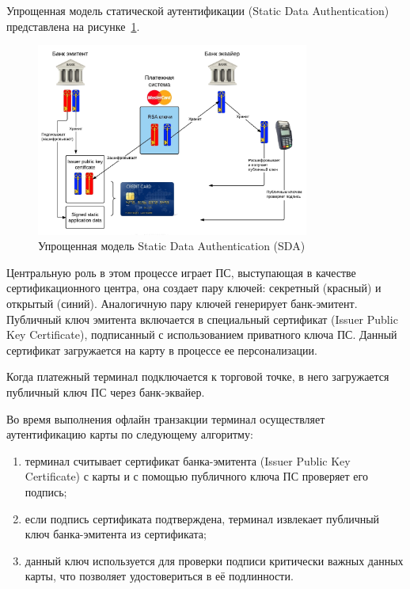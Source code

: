 Упрощенная модель статической аутентификации (Static Data Authentication) представлена на рисунке~\ref{fig:sda}.

\begin{figure}[H]
    \centering
    \includegraphics[width=0.8\textwidth]{images/research/sda}
    \caption{\centering Упрощенная модель Static Data Authentication (SDA)}
    \label{fig:sda}
\end{figure}

Центральную роль в этом процессе играет ПС, выступающая в качестве сертификационного центра, она создает пару ключей: секретный (красный) и открытый (синий).
Аналогичную пару ключей генерирует банк-эмитент.
Публичный ключ эмитента включается в специальный сертификат (Issuer Public Key Certificate), подписанный с использованием приватного ключа ПС.
Данный сертификат загружается на карту в процессе ее персонализации.

Когда платежный терминал подключается к торговой точке, в него загружается публичный ключ ПС через банк-эквайер.

Во время выполнения офлайн транзакции терминал осуществляет аутентификацию карты по следующему алгоритму:

\begin{enumerate}
    \item терминал считывает сертификат банка-эмитента (Issuer Public Key Certificate) с карты и с помощью публичного ключа ПС проверяет его подпись;
    \item если подпись сертификата подтверждена, терминал извлекает публичный ключ банка-эмитента из сертификата;
    \item данный ключ используется для проверки подписи критически важных данных карты, что позволяет удостовериться в её подлинности.
\end{enumerate}


